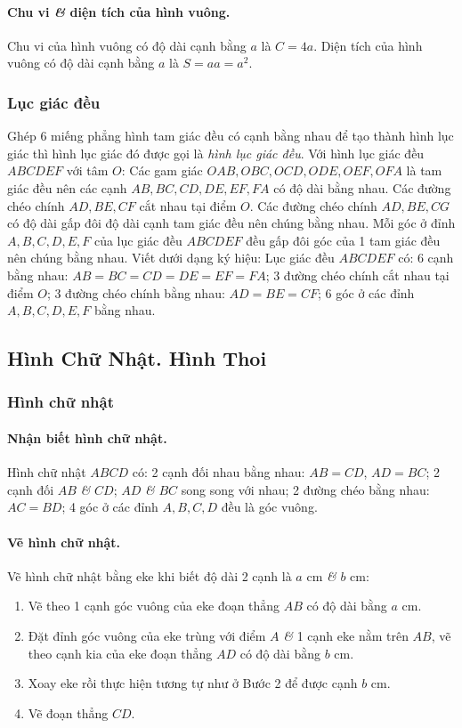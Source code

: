 \documentclass{article}
\numberwithin{equation}{section}
\begin{document}
\paragraph{Chu vi \textit{\&} diện tích của hình vuông.} Chu vi của hình vuông có độ dài cạnh bằng $a$ là $C = 4a$. Diện tích của hình vuông có độ dài cạnh bằng $a$ là $S = aa = a^2$.

\subsubsection{Lục giác đều}
Ghép 6 miếng phẳng hình tam giác đều có cạnh bằng nhau để tạo thành hình lục giác thì hình lục giác đó được gọi là \emph{hình lục giác đều}. Với hình lục giác đều $ABCDEF$ với tâm $O$: Các gam giác $OAB,OBC,OCD,ODE,OEF,OFA$ là tam giác đều nên các cạnh $AB,BC,CD,DE,EF,FA$ có độ dài bằng nhau. Các đường chéo chính $AD,BE,CF$ cắt nhau tại điểm $O$. Các đường chéo chính $AD,BE,CG$ có độ dài gấp đôi độ dài cạnh tam giác đều nên chúng bằng nhau. Mỗi góc ở đỉnh $A,B,C,D,E,F$ của lục giác đều $ABCDEF$ đều gấp đôi góc của 1 tam giác đều nên chúng bằng nhau. Viết dưới dạng ký hiệu: Lục giác đều $ABCDEF$ có: 6 cạnh bằng nhau: $AB = BC = CD = DE = EF = FA$; 3 đường chéo chính cắt nhau tại điểm $O$; 3 đường chéo chính bằng nhau: $AD = BE = CF$; 6 góc ở các đỉnh $A,B,C,D,E,F$ bằng nhau.

\subsection{Hình Chữ Nhật. Hình Thoi}

\subsubsection{Hình chữ nhật}

\paragraph{Nhận biết hình chữ nhật.} Hình chữ nhật $ABCD$ có: 2 cạnh đối nhau bằng nhau: $AB = CD$, $AD = BC$; 2 cạnh đối $AB$ \textit{\&} $CD$; $AD$ \textit{\&} $BC$ song song với nhau; 2 đường chéo bằng nhau: $AC = BD$; 4 góc ở các đỉnh $A,B,C,D$ đều là góc vuông.

\paragraph{Vẽ hình chữ nhật.} Vẽ hình chữ nhật bằng eke khi biết độ dài 2 cạnh là $a$ cm \textit{\&} $b$ cm:
\begin{enumerate}
	\item Vẽ theo 1 cạnh góc vuông của eke đoạn thẳng $AB$ có độ dài bằng $a$ cm.
	\item Đặt đỉnh góc vuông của eke trùng với điểm $A$ \textit{\&} 1 cạnh eke nằm trên $AB$, vẽ theo cạnh kia của eke đoạn thẳng $AD$ có độ dài bằng $b$ cm.
	\item Xoay eke rồi thực hiện tương tự như ở Bước 2 để được cạnh $b$ cm.
	\item Vẽ đoạn thẳng $CD$.
\end{enumerate}
\end{document}
